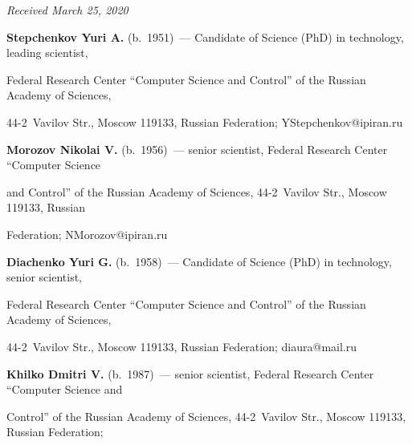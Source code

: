 \hfill{\small\textit{Received March 25, 2020}} 












\Contr



\noindent

\textbf{Stepchenkov Yuri A.} (b.\ 1951)~--- Candidate of Science (PhD) in technology, leading scientist, 

Federal Research Center ``Computer Science and Control'' of the Russian Academy of Sciences, 

44-2~Vavilov Str., Moscow 119133, Russian Federation; \mbox{YStepchenkov@ipiran.ru}



\vspace*{3pt}



\noindent

\textbf{Morozov Nikolai V.} (b.\ 1956)~---  senior scientist, Federal Research Center ``Computer Science 

and Control'' of the Russian Academy of Sciences, 44-2~Vavilov Str., Moscow 119133, Russian 

Federation; \mbox{NMorozov@ipiran.ru} 



\vspace*{3pt}



\noindent

\textbf{Diachenko Yuri G.} (b.\ 1958)~--- Candidate of Science (PhD) in technology, senior scientist, 

Federal Research Center ``Computer Science and Control'' of the Russian Academy of Sciences, 

44-2~Vavilov Str., Moscow 119133, Russian Federation; \mbox{diaura@mail.ru}



\vspace*{3pt}



\noindent

\textbf{Khilko Dmitri V.} (b.\ 1987)~--- senior scientist, Federal Research Center ``Computer Science and 

Control'' of the Russian Academy of Sciences, 44-2~Vavilov Str., Moscow 119133, Russian Federation; 


